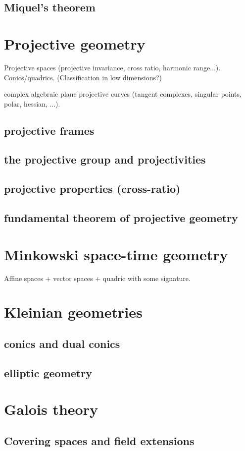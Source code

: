 \documentclass[a4,12pt]{amsbook}
\begin{document}
\section{Miquel's theorem}
\chapter{Projective geometry}
Projective spaces (projective invariance, cross ratio, harmonic range...). Conics/quadrics. (Classification in low dimensions?)
\par
complex algebraic plane projective curves (tangent complexes, singular points, polar, hessian, ...).
\section{projective frames}
\section{the projective group and projectivities}
\section{projective properties (cross-ratio)}
\section{fundamental theorem of projective geometry}
\chapter{Minkowski space-time geometry}
Affine spaces + vector spaces + quadric with some signature.
\chapter{Kleinian geometries}
\section{conics and dual conics}
\section{elliptic geometry}
\chapter{Galois theory}
\section{Covering spaces and field extensions}
\end{document}

